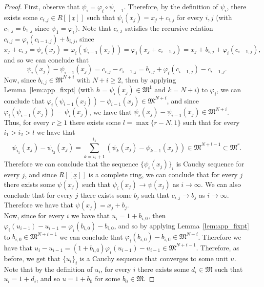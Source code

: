 \documentclass{article}
\numberwithin{theorem}{section}
\begin{document}
\begin{proof}
    First, observe that $\psi_i = \varphi_i \circ \psi_{i-1}$. Therefore, by the definition of $\psi_i$, there exists some $c_{i,j} \in R[[\underline{x}]]$ such that $\psi_i(x_j)=x_j+c_{i,j}$ for every $i,j$ (with $c_{1,j}=b_{1,j}$ since $\psi_1=\varphi_1$). Note that $c_{i,j}$ satisfies the recursive relation $c_{i,j}=\varphi_i(c_{i-1,j})+b_{i,j}$, since 
    \begin{equation*}
        x_j + c_{i,j} = \psi_i(x_j) = \varphi_i(\psi_{i-1}(x_j))=\varphi_i(x_j+c_{i-1,j})= x_j + b_{i,j} +  \varphi_i(c_{i-1,j}),
    \end{equation*}
    \noindent and so we can conclude that
    \begin{equation*}
        \psi_i(x_j)-\psi_{i-1}(x_j) = c_{i,j} - c_{i-1,j} = b_{i,j} + \varphi_i(c_{i-1,j}) -c_{i-1,j}.
    \end{equation*}
    \noindent Now, since $b_{i,j} \in \mathfrak{M}^{N+i}$ with $N+i \geq 2$, then by applying Lemma~\ref{lem:app_fixpt} (with $h=\psi_i(x_j) \in \mathfrak{M}^1$ and $k=N+i$) to $\varphi_i$, we can conclude that $\varphi_i(\psi_{i-1}(x_j)) - \psi_{i-1}(x_j) \in \mathfrak{M}^{N+i}$, and since $\varphi_i(\psi_{i-1}(x_j))=\psi_i(x_j)$, we have that $\psi_i(x_j)-\psi_{i-1}(x_j) \in \mathfrak{M}^{N+i}$.\\
    
    Thus, for every $r \geq 1$ there exists some $l=\max\{r-N, 1\}$ such that for every $i_1 > i_2 > l$ we have that 
    \begin{equation*}
        \psi_{i_1}(x_j)-\psi_{i_2}(x_j) = \sum_{k=i_2+1}^{i_1} (\psi_k(x_j)- \psi_{k-1}(x_j)) \in \mathfrak{M}^{N+l-1} \subset \mathfrak{M}^r. 
    \end{equation*}
    \noindent Therefore we can conclude that the sequence $\{\psi_i(x_j)\}_i$ is  Cauchy sequence for every $j$, and since $R[[\underline{x}]]$ is a complete ring, we can conclude that for every $j$ there exists some $\psi(x_j)$  such that $\psi_i(x_j) \to \psi(x_j)$ as $i \to \infty$. We can also  conclude that for every $j$ there exists some $b_j$ such that $c_{i,j} \to b_j$ as $i \to \infty$. Therefore we have that $\psi(x_j)=x_j+b_j$. \\

    Now, since for every $i$ we have that $u_i=1+b_{i,0}$, then $\varphi_i(u_{i-1})-u_{i-1} = \varphi_i(b_{i,0})-b_{i,0}$, and so by applying Lemma~\ref{lem:app_fixpt} to $b_{i,0} \in \mathfrak{M}^{N+i-1}$ we can conclude that $ \varphi_i(b_{i,0})-b_{i,0} \in \mathfrak{M}^{N+i}$. Therefore we have that $u_i - u_{i-1} = (1+b_{i,0})\varphi_i(u_{i-1})-u_{i-1} \in \mathfrak{M}^{N+i-1}$. Therefore, as before, we get that $\{u_i\}_i$ is a Cauchy sequence that converges to some unit $u$. Note that by the definition of $u_i$, for every $i$ there exists some $d_i \in \mathfrak{M}$ such that $u_i=1+d_i$, and so $u=1+b_0$ for some $b_0 \in \mathfrak{M}$.  
\end{proof}
\end{document}
